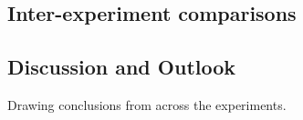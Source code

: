 \subsection{Inter-experiment comparisons}
\label{sec:Inter-experiment comparisons}
\subsection{Discussion and Outlook}
\label{sec:discussion_and_outlook}
Drawing conclusions from across the experiments. 

